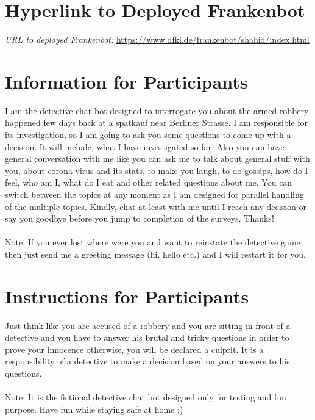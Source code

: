 
\begin{appendix}
\renewcommand\thesection{\Alph{section}}

\section{Hyperlink to Deployed Frankenbot\label{appen:deplFrank}}
     \textit{URL to deployed Frankenbot: } \url{https://www.dfki.de/frankenbot/shahid/index.html}

\section{Information for Participants\label{appen:info}}
I am the detective chat bot designed to interrogate you about the armed robbery happened few days back at a spatkauf near Berliner Strasse. I am responsible for its investigation, so I am going to ask you some questions to come up with a decision. It will include, what I have investigated so far. Also you can have general conversation with me like you can ask me to talk about general stuff with you, about corona virus and its stats, to make you laugh, to do gossips, how do I feel, who am I, what do I eat and other related questions about me. You can switch between the topics at any moment as I am designed for parallel handling of the multiple topics. Kindly, chat at least with me until I reach any decision or say you goodbye before you jump to completion of the surveys. Thanks!
\\~\\
Note: If you ever lost where were you and want to reinstate the detective game then just send me a greeting message (hi, hello etc.) and I will restart it for you.

\section{Instructions for Participants\label{appen:instr}}
Just think like you are accused of a robbery and you are sitting in front of a detective and you have to answer his brutal and tricky questions in order to prove your innocence otherwise, you will be declared a culprit. It is a responsibility of a detective to make a decision based on your answers to his questions.
\\~\\
Note: It is the fictional detective chat bot designed only for testing and fun purpose. Have fun while staying safe at home :)


\end{appendix}
